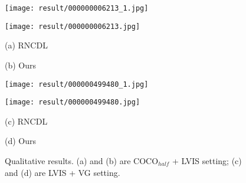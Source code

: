 \begin{figure}[!t] 
\begin{minipage}{0.49\linewidth}
\centerline{\texttt{[image: result/000000006213\_1.jpg]}}
\end{minipage}
\begin{minipage}{0.49\linewidth}
\centerline{\texttt{[image: result/000000006213.jpg]}}
\end{minipage}

\begin{minipage}{0.49\linewidth}
\centerline{\footnotesize (a) RNCDL}
\end{minipage}
\begin{minipage}{0.49\linewidth}
\centerline{\footnotesize (b) Ours}
\end{minipage}

\begin{minipage}{0.49\linewidth}
\centerline{\texttt{[image: result/000000499480\_1.jpg]}}
\end{minipage}
\begin{minipage}{0.49\linewidth}
\centerline{\texttt{[image: result/000000499480.jpg]}}
\end{minipage}

\begin{minipage}{0.49\linewidth}
\centerline{\footnotesize (c) RNCDL}
\end{minipage}
\begin{minipage}{0.49\linewidth}
\centerline{\footnotesize (d) Ours}
\end{minipage}
\caption{Qualitative results. (a) and (b) are COCO$_{half}$ + LVIS setting; (c) and (d) are LVIS + VG setting.}
\label{fig:result}
\end{figure}

